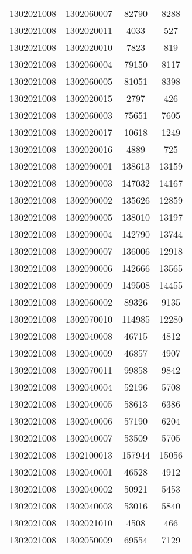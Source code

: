 \begin{longtable}{llcc}
1302021008 & 1302060007 & 82790 & 8288\\
1302021008 & 1302020011 & 4033 & 527\\
1302021008 & 1302020010 & 7823 & 819\\
1302021008 & 1302060004 & 79150 & 8117\\
1302021008 & 1302060005 & 81051 & 8398\\
1302021008 & 1302020015 & 2797 & 426\\
1302021008 & 1302060003 & 75651 & 7605\\
1302021008 & 1302020017 & 10618 & 1249\\
1302021008 & 1302020016 & 4889 & 725\\
1302021008 & 1302090001 & 138613 & 13159\\
1302021008 & 1302090003 & 147032 & 14167\\
1302021008 & 1302090002 & 135626 & 12859\\
1302021008 & 1302090005 & 138010 & 13197\\
1302021008 & 1302090004 & 142790 & 13744\\
1302021008 & 1302090007 & 136006 & 12918\\
1302021008 & 1302090006 & 142666 & 13565\\
1302021008 & 1302090009 & 149508 & 14455\\
1302021008 & 1302060002 & 89326 & 9135\\
1302021008 & 1302070010 & 114985 & 12280\\
1302021008 & 1302040008 & 46715 & 4812\\
1302021008 & 1302040009 & 46857 & 4907\\
1302021008 & 1302070011 & 99858 & 9842\\
1302021008 & 1302040004 & 52196 & 5708\\
1302021008 & 1302040005 & 58613 & 6386\\
1302021008 & 1302040006 & 57190 & 6204\\
1302021008 & 1302040007 & 53509 & 5705\\
1302021008 & 1302100013 & 157944 & 15056\\
1302021008 & 1302040001 & 46528 & 4912\\
1302021008 & 1302040002 & 50921 & 5453\\
1302021008 & 1302040003 & 53016 & 5840\\
1302021008 & 1302021010 & 4508 & 466\\
1302021008 & 1302050009 & 69554 & 7129\\

\end{longtable}
